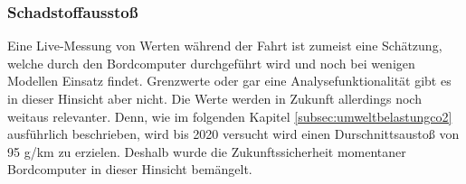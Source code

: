 \subsubsection{Schadstoffausstoß}
Eine Live-Messung von  Werten während der Fahrt ist zumeist eine Schätzung, welche durch den Bordcomputer durchgeführt wird und noch bei wenigen Modellen Einsatz findet. Grenzwerte oder gar eine Analysefunktionalität gibt es in dieser Hinsicht aber nicht. Die  Werte werden in Zukunft allerdings noch weitaus relevanter. Denn, wie im folgenden Kapitel \ref{subsec:umweltbelastungco2} ausführlich beschrieben, wird bis 2020 versucht wird einen Durschnittsaustoß von 95 g/km zu erzielen. \cite{SIMR.CH1-Fahrstil_Analyse.EUVerordCO2} Deshalb wurde die Zukunftssicherheit momentaner Bordcomputer in dieser Hinsicht bemängelt.

\clearpage %